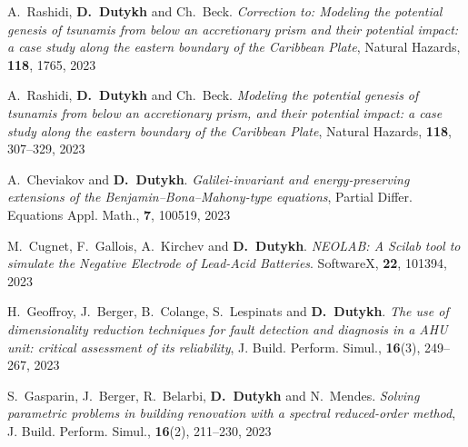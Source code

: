\documentclass[final, a4paper, oneside, 12pt]{article}
\numberwithin{equation}{section}
\begin{document}
\begin{etaremune}
  

  \item A.~Rashidi, \textbf{D.~Dutykh} and Ch.~Beck. \textit{Correction to: Modeling the potential genesis of tsunamis from below an accretionary prism and their potential impact: a case study along the eastern boundary of the Caribbean Plate}, Natural Hazards, \textbf{118}, 1765, 2023 %
  
  \item A.~Rashidi, \textbf{D.~Dutykh} and Ch.~Beck. \textit{Modeling the potential genesis of tsunamis from below an accretionary prism, and their potential impact: a case study along the eastern boundary of the Caribbean Plate}, Natural Hazards, \textbf{118}, 307--329, 2023 %

  \item A.~Cheviakov and \textbf{D.~Dutykh}. \textit{Galilei-invariant and energy-preserving extensions of the Benjamin--Bona--Mahony-type equations}, Partial Differ. Equations Appl. Math., \textbf{7}, 100519, 2023 %

  \item M.~Cugnet, F.~Gallois, A.~Kirchev and \textbf{D.~Dutykh}. \textit{NEOLAB: A Scilab tool to simulate the Negative Electrode of Lead-Acid Batteries}. SoftwareX, \textbf{22}, 101394, 2023 %
  
  \item H.~Geoffroy, J.~Berger, B.~Colange, S.~Lespinats and \textbf{D.~Dutykh}. \textit{The use of dimensionality reduction techniques for fault detection and diagnosis in a AHU unit: critical assessment of its reliability}, J. Build. Perform. Simul., \textbf{16}(3), 249--267, 2023 %

  \item S.~Gasparin, J.~Berger, R.~Belarbi, \textbf{D.~Dutykh} and N.~Mendes. \textit{Solving parametric problems in building renovation with a spectral reduced-order method}, J. Build. Perform. Simul., \textbf{16}(2), 211--230, 2023 %


  

\end{etaremune}
\end{document}

